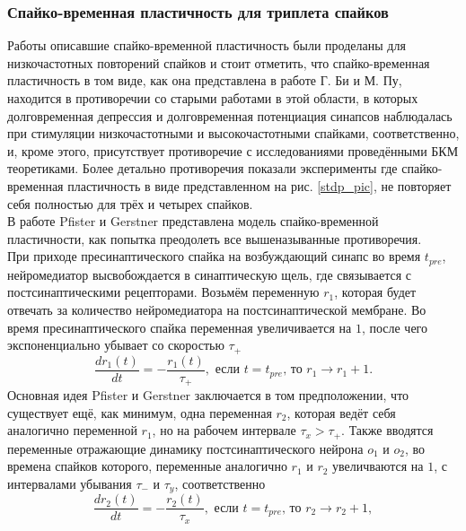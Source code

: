 \documentclass[a4paper,10pt]{article}
\begin{document}
\subsubsection{Спайко-временная пластичность для триплета спайков}
\indent Работы описавшие спайко-временной пластичность были проделаны для низкочастотных повторений спайков и стоит отметить, что спайко-временная пластичность в том виде, как она представлена в работе Г. Би и М. Пу\cite{stdp4}, находится в противоречии со старыми работами в этой области, в которых долговременная депрессия и долговременная потенциация синапсов наблюдалась при стимуляции низкочастотными и высокочастотными спайками, соответственно\cite{caporale2008spike}, и, кроме этого, присутствует противоречие с исследованиями проведёнными БКМ теоретиками\cite{Cooper}. Более детально противоречия показали эксперименты\cite{bi2002temporal,froemke2002spike,wang2005coactivation} где спайко-временная пластичность в виде представленном на рис. \ref{stdp_pic}, не повторяет себя полностью для трёх и четырех спайков.\\
\indent В работе Pfister и Gerstner\cite{PfisterTriple} представлена модель спайко-временной пластичности, как попытка преодолеть все вышеназыванные противоречия.\\
\indent При приходе пресинаптического спайка на возбуждающий синапс во время $t_{pre}$, нейромедиатор высвобождается в синаптическую щель, где связывается с постсинаптическими рецепторами. Возьмём переменную $r_{1}$, которая будет отвечать за количество нейромедиатора на постсинаптической мембране. Во время пресинаптического спайка переменная увеличивается на $1$, после чего экспоненциально убывает со скоростью $\tau_{+}$
\begin{equation}
\frac{dr_{1}(t)}{dt} = -\frac{r_{1}(t)}{\tau_{+}}, \mbox{ если } t=t_{pre}\mbox{, то }r_{1} \rightarrow r_{1} + 1.
\end{equation}
\indent Основная идея Pfister и Gerstner заключается в том предположении, что существует ещё, как минимум, одна переменная $r_{2}$, которая ведёт себя аналогично переменной $r_{1}$, но на рабочем интервале $\tau_{x}>\tau_{+}$. Также вводятся переменные отражающие динамику постсинаптического нейрона $o_{1}$ и $o_{2}$, во времена спайков которого, переменные аналогично $r_{1}$ и $r_{2}$ увеличваются на $1$, с интервалами убывания $\tau_{-}$ и $\tau_{y}$, соответственно
\begin{equation*}
\frac{dr_{2}(t)}{dt} = -\frac{r_{2}(t)}{\tau_{x}}, \mbox{ если } t=t_{pre}\mbox{, то }r_{2} \rightarrow r_{2} + 1,
\end{equation*}
\end{document}

